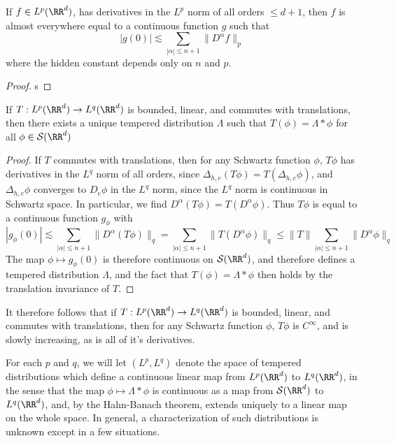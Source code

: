 \begin{lemma}
    If $f \in L^p(\RR^d)$, has derivatives in the $L^p$ norm of all orders $\leq d+1$, then $f$ is almost everywhere equal to a continuous function $g$ such that
    \[ |g(0)| \lesssim \sum_{|\alpha| \leq n + 1} \| D^\alpha f \|_p \]
    where the hidden constant depends only on $n$ and $p$.
\end{lemma}
\begin{proof}
    s
\end{proof}

\begin{theorem}
    If $T: L^p(\RR^d) \to L^q(\RR^d)$ is bounded, linear, and commutes with translations, then there exists a unique tempered distribution $\Lambda$ such that $T(\phi) = \Lambda * \phi$ for all $\phi \in \mathcal{S}(\RR^d)$
\end{theorem}
\begin{proof}
    If $T$ commutes with translations, then for any Schwartz function $\phi$, $T\phi$ has derivatives in the $L^q$ norm of all orders, since $\Delta_{h,e}(T \phi) = T(\Delta_{h,e} \phi)$, and $\Delta_{h,e} \phi$ converges to $D_e \phi$ in the $L^q$ norm, since the $L^q$ norm is continuous in Schwartz space. In particular, we find $D^\alpha (T\phi) = T(D^\alpha \phi)$. Thus $T\phi$ is equal to a continuous function $g_\phi$ with
    \[ |g_\phi(0)| \lesssim \sum_{|\alpha| \leq n+1} \| D^\alpha(T\phi) \|_q = \sum_{|\alpha| \leq n+1} \| T(D^\alpha \phi) \|_q \leq \| T \| \sum_{|\alpha| \leq n+1} \| D^\alpha \phi \|_q \]
    The map $\phi \mapsto g_\phi(0)$ is therefore continuous on $\mathcal{S}(\RR^d)$, and therefore defines a tempered distribution $\Lambda$, and the fact that $T(\phi) = \Lambda * \phi$ then holds by the translation invariance of $T$.
\end{proof}

\begin{remark}
    It therefore follows that if $T: L^p(\RR^d) \to L^q(\RR^d)$ is bounded, linear, and commutes with translations, then for any Schwartz function $\phi$, $T\phi$ is $C^\infty$, and is slowly increasing, as is all of it's derivatives.
\end{remark}

For each $p$ and $q$, we will let $(L^p,L^q)$ denote the space of tempered distributions which define a continuous linear map from $L^p(\RR^d)$ to $L^q(\RR^d)$, in the sense that the map $\phi \mapsto \Lambda * \phi$ is continuous as a map from $\mathcal{S}(\RR^d)$ to $L^q(\RR^d)$, and, by the Hahn-Banach theorem, extends uniquely to a linear map on the whole space. In general, a characterization of such distributions is unknown except in a few situations.

